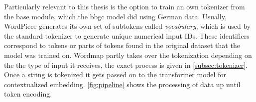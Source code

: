 Particularly relevant to this thesis is the option to train an own tokenizer from the base module, which the \ac{bbgc} model did using German data.
Usually, WordPiece generates its own set of subtokens called \textit{vocabulary}, which is used by the standard tokenizer to generate unique numerical input IDs.
These identifiers correspond to tokens or parts of tokens found in the original dataset that the model was trained on.
Wordmap partly takes over the tokenization depending on the the type of input it receives, the exact process is given in \autoref{subsec:tokenizer}.
Once a string is tokenized it gets passed on to the transformer model for contextualized embedding.
\autoref{fig:pipeline} shows the processing of data up until token encoding.

\begin{figure}
    \centering



\end{figure}
